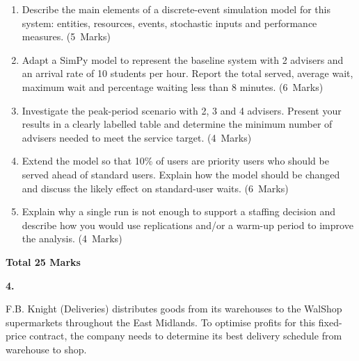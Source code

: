 \documentclass[11pt,a4paper]{article}
\newcommand{\markalloc}[1]{\nobreak\hfill\mbox{(#1 Marks)}}
\newcommand{\questiontotal}[1]{\begin{flushright}\textbf{Total #1 Marks}\end{flushright}}
\begin{document}
\begin{enumerate}
\item Describe the main elements of a discrete-event simulation model for this system: entities, resources, events, stochastic inputs and performance measures. \markalloc{5}

\item Adapt a SimPy model to represent the baseline system with 2 advisers and an arrival rate of 10 students per hour. Report the total served, average wait, maximum wait and percentage waiting less than 8 minutes. \markalloc{6}

\item Investigate the peak-period scenario with 2, 3 and 4 advisers. Present your results in a clearly labelled table and determine the minimum number of advisers needed to meet the service target. \markalloc{4}

\item Extend the model so that 10\% of users are priority users who should be served ahead of standard users. Explain how the model should be changed and discuss the likely effect on standard-user waits. \markalloc{6}

\item Explain why a single run is not enough to support a staffing decision and describe how you would use replications and/or a warm-up period to improve the analysis. \markalloc{4}
\end{enumerate}

\questiontotal{25}

\newpage

\textbf{4.}

F.B. Knight (Deliveries) distributes goods from its warehouses to the WalShop supermarkets throughout the East Midlands.
To optimise profits for this fixed-price contract, the company needs to determine its best delivery schedule from warehouse to shop.
\end{document}
